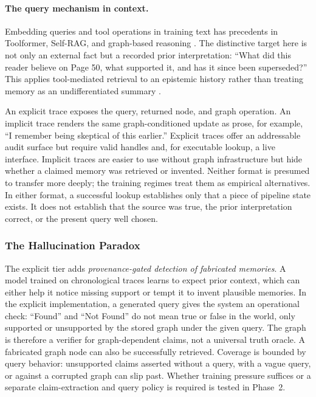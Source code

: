 \paragraph{The query mechanism in context.} Embedding queries and tool
operations in training text has precedents in Toolformer, Self-RAG, and
graph-based reasoning \cite{schick2023toolformer,asai2023selfrag,yao2024graphcot}.
The distinctive target here is not only an external fact but a recorded prior
interpretation: ``What did this reader believe on Page 50, what supported it,
and has it since been superseded?'' This applies tool-mediated retrieval to an
epistemic history rather than treating memory as an undifferentiated summary
\cite{packer2023memgpt}.

An explicit trace exposes the query, returned node, and graph operation. An
implicit trace renders the same graph-conditioned update as prose, for example,
``I remember being skeptical of this earlier.'' Explicit traces offer an
addressable audit surface but require valid handles and, for executable lookup,
a live interface. Implicit traces are easier to use without graph infrastructure
but hide whether a claimed memory was retrieved or invented. Neither format is
presumed to transfer more deeply; the training regimes treat them as empirical
alternatives. In either format, a successful lookup establishes only that a
piece of pipeline state exists. It does not establish that the source was true,
the prior interpretation correct, or the present query well chosen.

\subsubsection{The Hallucination Paradox}\label{sec:hallucination}

The explicit tier adds \emph{provenance-gated detection of fabricated
memories}. A model trained on chronological traces learns to expect prior
context, which can either help it notice missing support or tempt it to invent
plausible memories. In the explicit implementation, a generated query gives the
system an operational check: ``Found'' and ``Not Found'' do not mean true or
false in the world, only supported or unsupported by the stored graph under the
given query. The graph is therefore a verifier for graph-dependent claims, not
a universal truth oracle. A fabricated graph node can also be successfully
retrieved. Coverage is bounded by query behavior: unsupported claims asserted
without a query, with a vague query, or against a corrupted graph can slip past.
Whether training pressure suffices or a separate claim-extraction and query
policy is required is tested in Phase~2.

